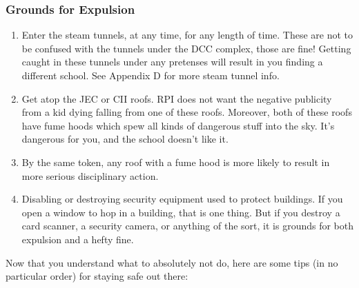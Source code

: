 \documentclass{article}
\begin{document}
\subsubsection{Grounds for Expulsion}
\begin{enumerate}
\item Enter the steam tunnels, at any time, for any length of time. These are not to be confused with the tunnels under the DCC complex, those are fine! Getting caught in these tunnels under any pretenses will result in you finding a different school. See Appendix D for more steam tunnel info.
\item Get atop the JEC or CII roofs. RPI does not want the negative publicity from a kid dying falling from one of these roofs. Moreover, both of these roofs have fume hoods which spew all kinds of dangerous stuff into the sky. It’s dangerous for you, and the school doesn’t like it.
\item By the same token, any roof with a fume hood is more likely to result in more serious disciplinary action.
\item Disabling or destroying security equipment used to protect buildings. If you open a window to hop in a building, that is one thing. But if you destroy a card scanner, a security camera, or anything of the sort, it is grounds for both expulsion and a hefty fine.
\end{enumerate}

Now that you understand what to absolutely not do, here are some tips (in no particular order) for staying safe out there:
\end{document}

